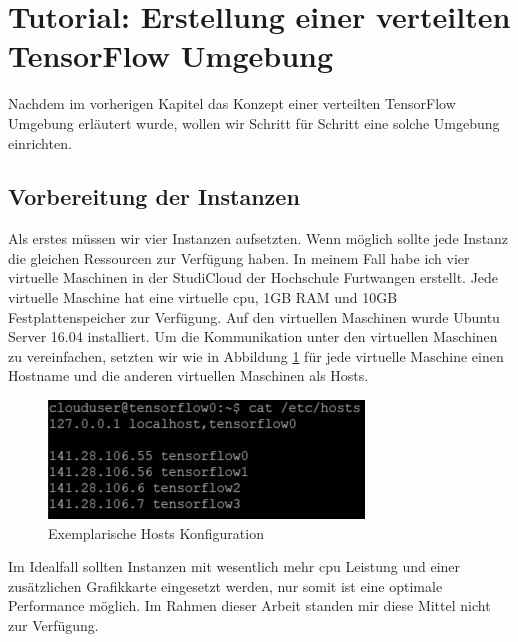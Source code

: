 \section{Tutorial: Erstellung einer verteilten TensorFlow Umgebung}
Nachdem im vorherigen Kapitel das Konzept einer verteilten TensorFlow Umgebung erläutert wurde, wollen wir Schritt für Schritt eine solche Umgebung einrichten.

\subsection{Vorbereitung der Instanzen}
Als erstes müssen wir vier Instanzen aufsetzten. Wenn möglich sollte jede Instanz die gleichen Ressourcen zur Verfügung haben. In meinem Fall habe ich vier virtuelle Maschinen in der StudiCloud der Hochschule Furtwangen erstellt. Jede virtuelle Maschine hat eine virtuelle \ac{cpu}, 1GB RAM und 10GB Festplattenspeicher zur Verfügung. Auf den virtuellen Maschinen wurde Ubuntu Server 16.04 installiert. Um die Kommunikation unter den virtuellen Maschinen zu vereinfachen, setzten wir wie in Abbildung \ref{fig:hostkonfiguration} für jede virtuelle Maschine einen Hostname und die anderen virtuellen Maschinen als Hosts. 

\begin{figure}[h!]
	\centering
	\includegraphics[width=0.9\linewidth]{Pictures/HostKonfiguration}
	\caption[Hosts Konfiguration]{Exemplarische Hosts Konfiguration}
	\label{fig:hostkonfiguration}
\end{figure}

Im Idealfall sollten Instanzen mit wesentlich mehr \ac{cpu} Leistung und einer zusätzlichen Grafikkarte eingesetzt werden, nur somit ist eine optimale Performance möglich. Im Rahmen dieser Arbeit standen mir diese Mittel nicht zur Verfügung.

